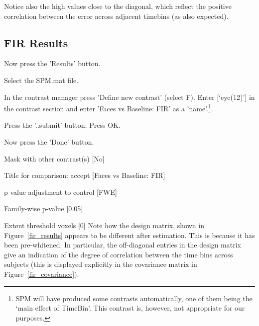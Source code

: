 Notice also the high values close to the diagonal, which reflect the positive correlation between the error across adjacent timebins (as also expected).

\subsection{FIR Results}

\bi
\item{Now press the 'Results' button.}
\item{Select the SPM.mat file.}
\item{In the contrast manager press 'Define new contrast' (select F). Enter [`eye(12)'] in the contrast section and enter 'Faces vs Baseline: FIR' as a 'name'.\footnote{SPM will have produced some contrasts automatically, one of them being the `main effect of TimeBin'. This contrast is, however, not 
appropriate for our purposes.}.}
\item{Press the '..submit' button. Press OK.}
\item{Now press the 'Done' button.}
\item{Mask with other contrast(s) [No]}
\item{Title for comparison: accept [Faces vs Baseline: FIR]}
\item{p value adjustment to control [FWE]}
\item{Family-wise p-value [0.05]}
\item{Extent threshold {voxels} [0]}
\ei
Note how the design matrix, shown in Figure~\ref{fir_results} appears to be different after estimation. This is because it has been pre-whitened. In particular, the off-diagonal entries in the design matrix give an indication of the degree of correlation between the time bins across subjects (this is displayed explicitly in the covariance matrix in Figure~\ref{fir_covariance}).

